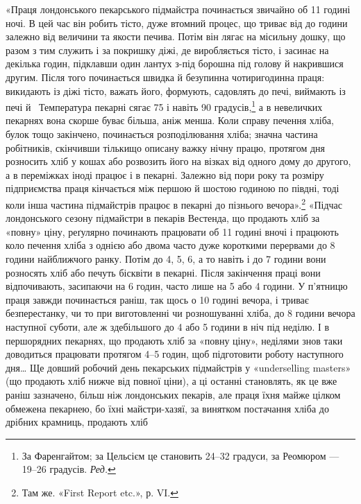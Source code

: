 «Праця лондонського пекарського підмайстра починається
звичайно об 11 годині ночі. В цей час він робить тісто, дуже втомний
процес, що триває від  до  години залежно від величини
та якости печива. Потім він лягає на місильну дошку, що разом
з тим служить і за покришку діжі, де виробляється тісто, і засинає
на декілька годин, підклавши один лантух з-під борошна під
голову й накрившися другим. Після того починається швидка й
безупинна чотиригодинна праця: викидають із діжі тісто, важать
його, формують, садовлять до печі, виймають із печі й~ Температура
пекарні сягає 75 і навіть 90 градусів,\footnote*{
За Фаренгайтом; за Цельсієм це становить 24--32 градуси, за
Реомюром — 19--26 градусів. \emph{Ред.}
} а в невеличких пекарнях
вона скорше буває більша, аніж менша. Коли справу печення
хліба, булок тощо закінчено, починається розподілювання хліба;
значна частина робітників, скінчивши тількищо описану важку
нічну працю, протягом дня розносить хліб у кошах або розвозить
його на візках від одного дому до другого, а в переміжках іноді працює
і в пекарні. Залежно від пори року та розміру підприємства
праця кінчається між першою й шостою годиною по півдні, тоді коли
інша частина підмайстрів працює в пекарні до пізнього вечора».\footnote{
Там же. «First Report etc.», р. VI.
}
«Підчас лондонського сезону підмайстри в пекарів Вестенда, що
продають хліб за «повну» ціну, реґулярно починають працювати
об 11 годині вночі і працюють коло печення хліба з однією або
двома часто дуже короткими перервами до 8 години найближчого
ранку. Потім до 4, 5, 6, а то навіть і до 7 години вони розносять
хліб або печуть бісквіти в пекарні. Після закінчення праці вони
відпочивають, засипаючи на 6 годин, часто лише на 5 або 4 години.
У п’ятницю праця завжди починається раніш, так щось о 10 годині
вечора, і триває безперестанку, чи то при виготовленні чи розношуванні
хліба, до 8 години вечора наступної суботи, але ж здебільшого
до 4 або 5 години в ніч під неділю. І в першорядних
пекарнях, що продають хліб за «повну ціну», неділями знов таки
доводиться працювати протягом 4--5 годин, щоб підготовити
роботу наступного дня\dots{} Ще довший робочий день пекарських
підмайстрів у «underselling masters» (що продають хліб нижче
від повної ціни), а ці останні становлять, як це вже раніш зазначено,
більш ніж  лондонських пекарів, але праця їхня
майже цілком обмежена пекарнею, бо їхні майстри-хазяї, за
винятком постачання хліба до дрібних крамниць, продають хліб
\parbreak{}  %
